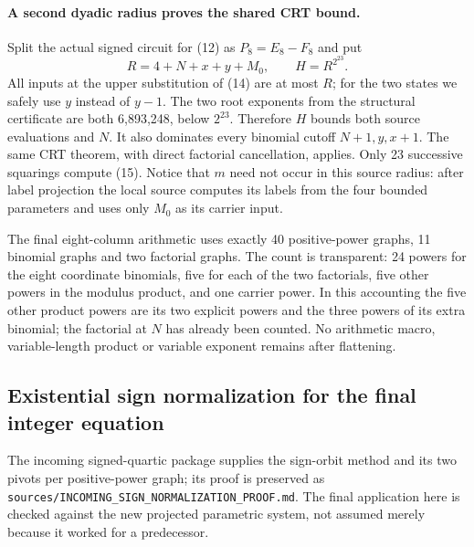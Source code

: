 \paragraph{A second dyadic radius proves the shared CRT bound.}
Split the actual signed circuit for (12) as $P_8=E_8-F_8$ and put
\[
 R=4+N+x+y+M_0,\qquad H=R^{2^{23}}. \tag{15}
\]
All inputs at the upper substitution of (14) are at most $R$; for the two
states we safely use $y$ instead of $y-1$.  The two root exponents from
the structural certificate are both 6,893,248, below $2^{23}$.
Therefore $H$ bounds both source evaluations and $N$.  It also dominates
every binomial cutoff $N+1,y,x+1$.  The same CRT theorem, with direct
factorial cancellation, applies.  Only 23 successive squarings compute
(15).  Notice that $m$ need not occur in this source radius: after label
projection the local source computes its labels from the four bounded
parameters and uses only $M_0$ as its carrier input.

The final eight-column arithmetic uses exactly 40 positive-power graphs,
11 binomial graphs and two factorial graphs.  The count is transparent:
24 powers for the eight coordinate binomials, five for each of the two
factorials, five other powers in the modulus product, and one carrier
power.  In this accounting the five other product powers are its two
explicit powers and the three powers of its extra binomial; the factorial
at $N$ has already been counted.  No arithmetic macro, variable-length
product or variable exponent remains after flattening.

\subsection{Existential sign normalization for the final integer equation}

The incoming signed-quartic package supplies the sign-orbit method
and its two pivots per positive-power graph; its proof is preserved as
\texttt{sources/INCOMING\_SIGN\_NORMALIZATION\_PROOF.md}.  The final
application here is checked against the new projected parametric system,
not assumed merely because it worked for a predecessor.

